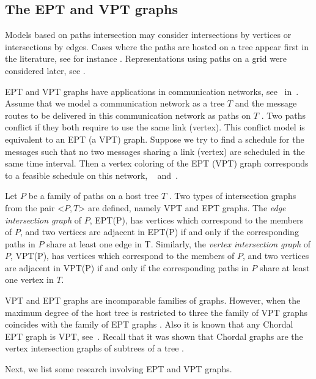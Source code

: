 \subsection{The EPT and VPT graphs}

Models based on paths intersection  may consider  intersections by vertices or   intersections by edges.  Cases where the paths are hosted on a tree  appear first in the literature, see for instance \cite{gavril1978recognition, golumbic1985edge, golumbic1985}.  Representations using paths on a grid were considered later, see  \cite{golumbic2009,golumbic2013, golumbic2013intersection}.

EPT and VPT graphs have applications in communication networks, see~\cite{boyaci2013graphs} in~\cite{brandstadt2013graph}. Assume
that we model a communication network as a tree $T$ and the message routes to be delivered in this communication network as paths on $T$ . Two paths conflict if they both require to use the same link (vertex). This conflict model is equivalent to an EPT (a VPT) graph. Suppose we try to find a schedule for the messages such that no two messages sharing a link (vertex) are scheduled in the same time interval. Then a vertex coloring of the EPT (VPT) graph corresponds to a feasible schedule on this network, ~\cite{boyaci2013graphs} and~\cite{brandstadt2013graph}.

 Let $P$ be a family of paths on a host tree $T$ . Two types of intersection graphs from the pair <$P,T$> are defined, namely VPT and EPT graphs.
The \textit{edge intersection graph} of $P$, EPT(P), has vertices which correspond to the members of $P$, and two vertices are adjacent in EPT(P) if and only if the corresponding paths in $P$ share at least one edge in T. Similarly, the \textit{vertex intersection graph} of $P$, VPT(P), has vertices which correspond to the members of $P$, and two vertices are adjacent in VPT(P) if and only if the corresponding paths in $P$ share at least one vertex in $T$.

VPT and EPT graphs are incomparable families of graphs. However, when the maximum degree of the host tree is restricted to three the family of
VPT graphs coincides with the family of EPT graphs \cite{golumbic1985edge}. Also it is known that any Chordal EPT graph is VPT, see~\cite{syslo1985triangulated}. Recall that it was shown that Chordal graphs are the vertex intersection graphs of subtrees of a tree \cite{gavril1974intersection}.

Next, we list some research involving EPT and VPT graphs.

